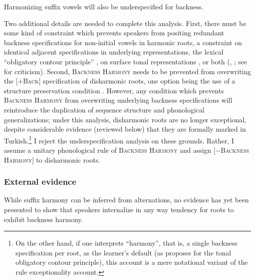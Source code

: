Harmonizing suffix vowels will also be underspecified for backness.

Two additional details are needed to complete this analysis. First, there must be some kind of constraint which prevents speakers from positing redundant backness specifications for non-initial vowels in harmonic roots, a constraint on identical adjacent specifications in underlying representations, the lexical ``obligatory contour principle'' \citep[][OCP]{Leben1973}, on surface tonal representations \citep{Goldsmith1976}, or both (\citealp{Leben1978}, \citealp{McCarthy1986}; see \citealp{Odden1986,Odden1988} for criticism). Second, \textsc{Backness Harmony} needs to be prevented from overwriting the [$+$\textsc{Back}] specification of disharmonic roots, one option being the use of a structure preservation condition \citep{Kiparsky1985}. However, any condition which prevents \textsc{Backness Harmony} from overwriting underlying backness specifications will reintroduce the duplication of sequence structure and phonological generalizations; under this analysis, disharmonic roots are no longer exceptional, despite considerable evidence (reviewed below) that they are formally marked in Turkish.\footnote{On the other hand, if one interprets ``harmony'', that is, a single backness specification per root, as the learner's default (as \citealp{Odden1986} proposes for the tonal obligatory contour principle), this account is a mere notational variant of the rule exceptionality account.}
I reject the underspecification analysis on these grounds. Rather, I assume a unitary phonological rule of \textsc{Backness Harmony} and assign [$-$\textsc{Backness Harmony}] to disharmonic roots.

\subsubsection{External evidence}
\label{backharmexternal}

While suffix harmony can be inferred from alternations, no evidence has yet been presented to show that speakers internalize in any way tendency for roots to exhibit backness harmony. 


